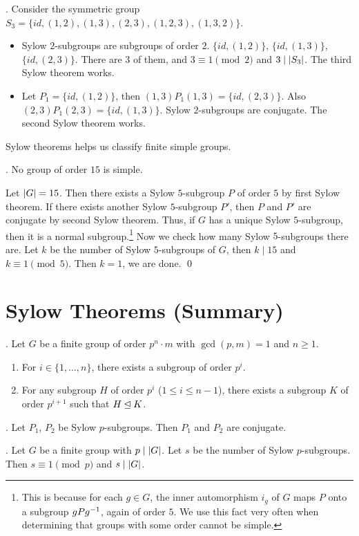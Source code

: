 \ex. Consider the symmetric group \(S_3 = \{id, (1, 2), (1, 3), (2, 3), (1, 2, 3), (1, 3, 2)\}\).
\begin{itemize}
    \item Sylow \(2\)-subgroups are subgroups of order \(2\). \(\{id, (1, 2)\}\), \(\{id, (1, 3)\}\), \(\{id, (2, 3)\}\). There are \(3\) of them, and \(3 \equiv 1 \pmod 2\) and \(3 \mid \left| S_3 \right|\). The third Sylow theorem works.
    \item Let \(P_1 = \{id, (1, 2)\}\), then \((1, 3) P_1 (1, 3) = \{id, (2, 3)\}\). Also \((2, 3)P_1(2, 3) = \{id, (1, 3)\}\). Sylow \(2\)-subgroups are conjugate. The second Sylow theorem works.
\end{itemize}

Sylow theorems helps us classify finite simple groups.

\ex. No group of order \(15\) is simple.

\pf Let \(\left| G \right| = 15\). Then there exists a Sylow \(5\)-subgroup \(P\) of order \(5\) by first Sylow theorem. If there exists another Sylow \(5\)-subgroup \(P'\), then \(P\) and \(P'\) are conjugate by second Sylow theorem. Thus, if \(G\) has a unique Sylow \(5\)-subgroup, then it is a normal subgroup.\footnote{This is because for each \(g \in G\), the inner automorphism \(i_g\) of \(G\) maps \(P\) onto a subgroup \(gPg^{-1}\), again of order \(5\). We use this fact very often when determining that groups with some order cannot be simple.} Now we check how many Sylow \(5\)-subgroups there are. Let \(k\) be the number of Sylow \(5\)-subgroups of \(G\), then \(k \mid 15\) and \(k \equiv 1 \pmod 5\). Then \(k = 1\), we are done. \qed

\section*{Sylow Theorems (Summary)}

\thm.  Let \(G\) be a finite group of order \(p^n \cdot m\) with \(\gcd(p, m) = 1\) and \(n \geq 1\).
\begin{enumerate}
    \item For \(i \in \{1, \dots, n\}\), there exists a subgroup of order \(p^i\).
    \item For any subgroup \(H\) of order \(p^i\) (\(1 \leq i \leq n - 1\)), there exists a subgroup \(K\) of order \(p^{i+1}\) such that \(H \unlhd K\).
\end{enumerate}

\thm.  Let \(P_1\), \(P_2\) be Sylow \(p\)-subgroups. Then \(P_1\) and \(P_2\) are conjugate.

\thm.  Let \(G\) be a finite group with \(p \mid \left| G \right|\). Let \(s\) be the number of Sylow \(p\)-subgroups. Then \(s \equiv 1 \pmod p\) and \(s \mid \left| G \right|\).

\pagebreak